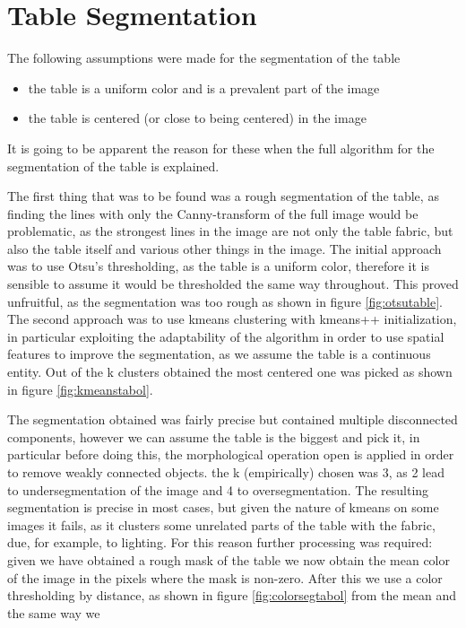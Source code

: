 \section{Table Segmentation}

The following assumptions were made for the segmentation of the table
\begin{itemize}
    \item the table is a uniform color and is a prevalent part of the image
    \item the table is centered (or close to being centered) in the image
\end{itemize}
It is going to be apparent the reason for these when the full algorithm for
the segmentation of the table is explained.\par
The first thing that was to be found was a rough segmentation of the table,
as finding the lines with only the Canny-transform of the full image would 
be problematic, as the strongest lines in the image are not only the table
fabric, but also the table itself and various other things in the image.
The initial approach was to use Otsu's thresholding, as the table is a uniform
color, therefore it is sensible to assume it would be thresholded the same
way throughout. This proved unfruitful, as the segmentation was too rough as shown in figure \ref{fig:otsutable}.
The second approach was to use kmeans clustering with kmeans++ initialization, in particular exploiting the
adaptability of the algorithm in order to use spatial features to improve
the segmentation, as we assume the table is a continuous entity. Out of the k clusters obtained the most centered one was picked as shown in figure \ref{fig:kmeanstabol}.\par
The segmentation obtained was fairly precise but contained multiple disconnected
components, however we can assume the table is the biggest and pick it, in particular
before doing this, the morphological operation open is applied in order to remove weakly connected objects.
the k (empirically) chosen was 3, as 2 lead to undersegmentation of the image and 4 to oversegmentation.
The resulting segmentation is precise in most cases, but given the nature of kmeans on some
images it fails, as it clusters some unrelated parts of the table with the fabric, due,
for example, to lighting.
For this reason further processing was required: given we have obtained a rough mask of
the table we now obtain the mean color of the image in the pixels where the mask is non-zero.
After this we use a color thresholding by distance, as shown in figure \ref{fig:colorsegtabol} from the mean and the same way we 
